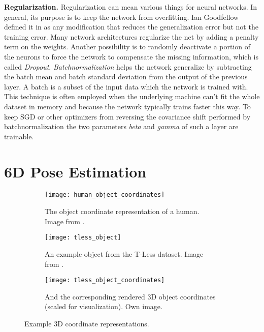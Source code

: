 \noindent\textbf{Regularization.} Regularization can mean various things for neural networks. In general, its purpose is to keep the network from overfitting. Ian Goodfellow defined it in \cite{goodfellow} as any modification that reduces the generalization error but not the training error. Many network architectures regularize the net by adding a penalty term on the weights. Another possibility is to randomly deactivate a portion of the neurons to force the network to compensate the missing information, which is called \textit{Dropout}. \textit{Batchnormalization} helps the network generalize by subtracting the batch mean and batch standard deviation from the output of the previous layer. A batch is a subset of the input data which the network is trained with. This technique is often employed when the underlying machine can't fit the whole dataset in memory and because the network typically trains faster this way. To keep SGD or other optimizers from reversing the covariance shift performed by batchnormalization the two parameters \textit{beta} and \textit{gamma} of such a layer are trainable.

\section{6D Pose Estimation}

\begin{figure}[!tbp]
	\centering
	\begin{subfigure}[t]{0.3\textwidth}
		\centering
    	\texttt{[image: human\_object\_coordinates]}
    	\caption{The object coordinate representation of a human. Image from \cite{tsharp}.}
    	\label{fig:human_object_coordinates}
	\end{subfigure}
	\begin{subfigure}[t]{0.3\textwidth}
		\centering
    	\texttt{[image: tless\_object]}
    	\caption{An example object from the T-Less dataset. Image from \cite{tless}.}
    	\label{fig:tless_object}
	\end{subfigure}
	\begin{subfigure}[t]{0.3\textwidth}
		\centering
    	\texttt{[image: tless\_object\_coordinates]}
    	\caption{And the corresponding rendered 3D object coordinates (scaled for visualization). Own image.}
    	\label{fig:tless_object_coordinates}
	\end{subfigure}
	\caption{Example 3D coordinate representations.}
\end{figure} 


